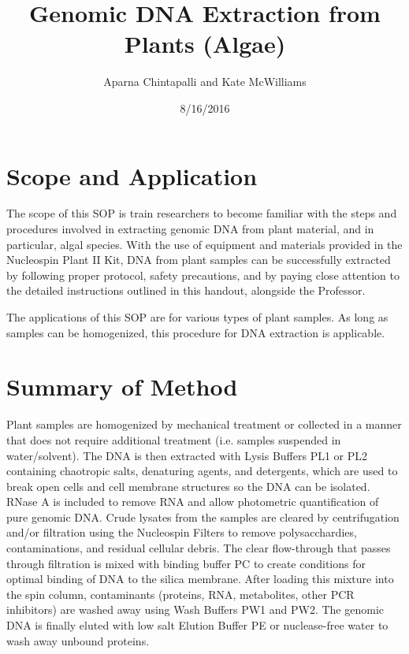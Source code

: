 \documentclass[12pt]{../SOP3_beta}\usepackage[]{graphicx}\usepackage[]{xcolor}
\title{Genomic DNA Extraction from Plants (Algae)}
\date{8/16/2016}
\author{Aparna Chintapalli and Kate McWilliams}
\begin{document}

\maketitle

\section{Scope and Application}

\NP The scope of this SOP is train researchers to become familiar with the steps and procedures involved in extracting genomic DNA from plant material, and in particular, algal species. With the use of equipment and materials provided in the Nucleospin Plant II Kit, DNA from plant samples can be successfully extracted by following proper protocol, safety precautions, and by paying close attention to the detailed instructions outlined in this handout, alongside the Professor. 

\NP The applications of this SOP are for various types of plant samples. As long as samples can be homogenized, this procedure for DNA extraction is applicable. 

\section{Summary of Method}

\NP Plant samples are homogenized by mechanical treatment or collected in a manner that does not require additional treatment (i.e. samples suspended in water/solvent). The DNA is then extracted with Lysis Buffers PL1 or PL2 containing chaotropic salts, denaturing agents, and detergents, which are used to break open cells and cell membrane structures so the DNA can be isolated. RNase A is included to remove RNA and allow photometric quantification of pure genomic DNA. Crude lysates from the samples are cleared by centrifugation and/or filtration using the Nucleospin Filters to remove polysacchardies, contaminations, and residual cellular debris. The clear flow-through that passes through filtration is mixed with binding buffer PC to create conditions for optimal binding of DNA to the silica membrane. After loading this mixture into the spin column, contaminants (proteins, RNA, metabolites, other PCR inhibitors) are washed away using Wash Buffers PW1 and PW2. The genomic DNA is finally eluted with low salt Elution Buffer PE or nuclease-free water to wash away unbound proteins.
\end{document}
